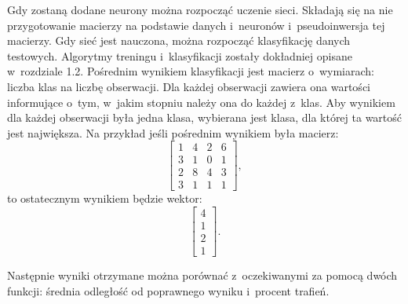 \documentclass[pl]{minipw} %
\begin{document}
Gdy zostaną dodane neurony można rozpocząć uczenie sieci. 
Składają się na nie przygotowanie macierzy na podstawie danych i~neuronów i~pseudoinwersja tej macierzy. 
Gdy sieć jest nauczona, można rozpocząć klasyfikację danych testowych.
Algorytmy treningu i~klasyfikacji zostały dokładniej opisane w~rozdziale 1.2.
Pośrednim wynikiem klasyfikacji jest macierz o~wymiarach: liczba klas na liczbę obserwacji.
Dla każdej obserwacji zawiera ona wartości informujące o~tym, w~jakim stopniu należy ona do każdej z~klas.
Aby wynikiem dla każdej obserwacji była jedna klasa, wybierana jest klasa, dla której ta wartość jest największa.
Na przykład jeśli pośrednim wynikiem była macierz:
\[ \begin{bmatrix} 1&4&2&6 \\ 3&1&0&1 \\ 2&8&4&3 \\ 3&1&1&1 \end{bmatrix},\]
to ostatecznym wynikiem będzie wektor:
\[ \begin{bmatrix} 4 \\ 1 \\ 2 \\ 1 \end{bmatrix}.\]

Następnie wyniki otrzymane można porównać z~oczekiwanymi za pomocą dwóch funkcji: średnia odległość od poprawnego wyniku i~procent trafień.
\end{document}
